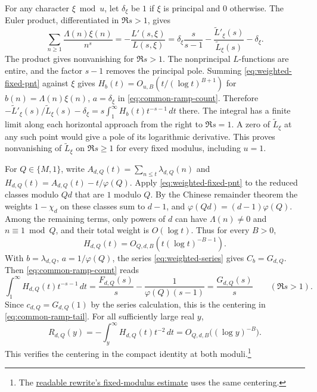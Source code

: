 %
For any character \(\xi\bmod u\), let \(\delta_\xi\) be \(1\) if \(\xi\)
is principal and \(0\) otherwise. The Euler product, differentiated
in \(\Re s>1\), gives
\begin{equation}\label{eq:common-character-series}
 \sum_{n\ge1}\frac{\Lambda(n)\xi(n)}{n^s}
  =-\frac{L'(s,\xi)}{L(s,\xi)}
  =\delta_\xi\frac{s}{s-1}
       -\frac{\widetilde L'_\xi(s)}{\widetilde L_\xi(s)}-\delta_\xi .
\end{equation}
\cite[(25.2.11), (25.15.1)--(25.15.4)]{dlmf}
The product gives nonvanishing for \(\Re s>1\). The nonprincipal
\(L\)-functions are entire, and the factor \(s-1\) removes the
principal pole. Summing \eqref{eq:weighted-fixed-pnt} against \(\xi\)
gives \(H_b(t)=O_{u,B}(t/(\log t)^{B+1})\) for
\(b(n)=\Lambda(n)\xi(n)\), \(a=\delta_\xi\) in
\eqref{eq:common-ramp-count}. Therefore
\(-\widetilde L'_\xi(s)/\widetilde L_\xi(s)-\delta_\xi
=s\int_1^\infty H_b(t)t^{-s-1}\,dt\) there. The integral has a finite
limit along each horizontal approach from the right to \(\Re s=1\).
A zero of \(\widetilde L_\xi\) at any such point would give a pole
of its logarithmic derivative. This proves nonvanishing of
\(\widetilde L_\xi\) on \(\Re s\ge1\) for every fixed modulus,
including \(u=1\).

For \(Q\in\{M,1\}\), write \(A_{d,Q}(t)=\sum_{n\le t}\lambda_{d,Q}(n)\)
and \(H_{d,Q}(t)=A_{d,Q}(t)-t/\varphi(Q)\).
Apply \eqref{eq:weighted-fixed-pnt} to the reduced classes modulo \(Qd\)
that are \(1\) modulo \(Q\). By the Chinese remainder theorem the weights
\(1-\chi_d\) on these classes sum to \(d-1\), and
\(\varphi(Qd)=(d-1)\varphi(Q)\). Among the remaining terms, only powers
of \(d\) can have \(\Lambda(n)\ne0\) and \(n\equiv1\bmod Q\), and their
total weight is \(O(\log t)\). Thus for every \(B>0\),
\[
 H_{d,Q}(t)=O_{Q,d,B}\!\left(t(\log t)^{-B-1}\right).
\]
With \(b=\lambda_{d,Q}\), \(a=1/\varphi(Q)\), the series
\eqref{eq:weighted-series} gives \(C_b=G_{d,Q}\). Then
\eqref{eq:common-ramp-count} reads
\begin{equation}\label{eq:weighted-centered-count}
 \int_1^\infty H_{d,Q}(t)t^{-s-1}\,dt
 =\frac{F_{d,Q}(s)}{s}-\frac{1}{\varphi(Q)(s-1)}
 =\frac{G_{d,Q}(s)}{s} \qquad (\Re s>1).
\end{equation}
Since \(c_{d,Q}=G_{d,Q}(1)\) by the series calculation, this is the
centering in \eqref{eq:common-ramp-tail}. For all sufficiently large real \(y\),
\begin{equation}\label{eq:weighted-fixed-remainder}
 R_{d,Q}(y)=-\int_y^\infty H_{d,Q}(t)t^{-2}\,dt
 =O_{Q,d,B}\big((\log y)^{-B}\big).
\end{equation}
This verifies the centering in the compact identity at both moduli.\footnote{The
\href{https://github.com/lsernau/grh-lean/blob/72fead102f663d5c7a407964a13dc0cf9d977207/grh/src/New/Reduction/Zeros/PrimeNumberTheorem.lean\#L211-L237}{readable rewrite's fixed-modulus estimate}
uses the same centering.}

